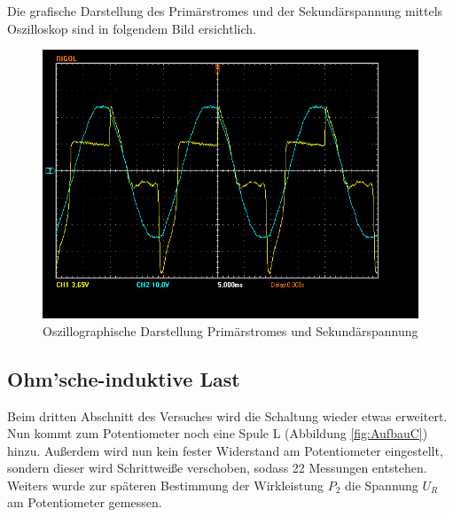 \documentclass[12pt,a4paper,twoside]{article}
\begin{document}
\noindent
Die grafische Darstellung des Primärstromes und der Sekundärspannung mittels Oszilloskop sind in folgendem Bild ersichtlich.

\begin{figure}[H]
    \centering
    \includegraphics[width=0.6\linewidth, angle=0]{nudes/A2 Oszi.jpg}
    \caption{Oszillographische Darstellung Primärstromes und Sekundärspannung}
    \label{fig:OszilloskopB}
\end{figure}


\subsection{Ohm'sche-induktive Last}

Beim dritten Abschnitt des Versuches wird die Schaltung wieder etwas erweitert. Nun kommt zum Potentiometer noch eine Spule L (Abbildung \ref{fig:AufbauC}) hinzu.
Außerdem wird nun kein fester Widerstand am Potentiometer eingestellt, sondern dieser wird Schrittweiße verschoben, sodass 22 Messungen entstehen. Weiters wurde zur späteren Bestimmung der Wirkleistung $P_{2}$ die Spannung $U_{R}$ am Potentiometer gemessen.
\end{document}
